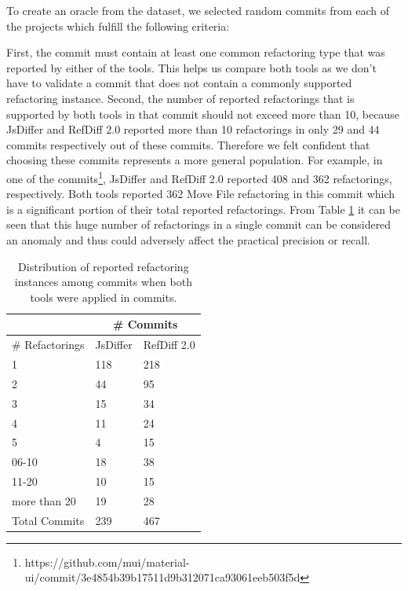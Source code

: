 \documentclass[letterpaper,12pt,onecolumn,final]{report}
\begin{document}
To create an oracle from the dataset, we selected \evCompareRandomCommitCount{} random commits from each of the projects which fulfill the following criteria:

First, the commit must contain at least one common refactoring type that was reported by either of the tools. This helps us compare both tools as we don't have to validate a commit that does not contain a commonly supported refactoring instance. Second, the number of reported refactorings that is supported by both tools in that commit should not exceed more than 10, because JsDiffer and RefDiff 2.0 reported more than 10 refactorings in only 29 and 44 commits respectively out of these \evCompareRandomCommitCount{} commits. Therefore we felt confident that choosing these commits represents a more general population. For example, in one of the commits\footnote{https://github.com/mui/material-ui/commit/3e4854b39b17511d9b312071ca93061eeb503f5d}, JsDiffer and RefDiff 2.0 reported 408 and 362 refactorings, respectively. Both tools reported 362 Move File refactoring in this commit which is a significant portion of their total reported refactorings. From Table \ref{table:refcountrange} it can be seen that this huge number of refactorings in a single commit can be considered an anomaly and thus could adversely affect the practical precision or recall.


\begin{table}[!ht]
    \centering
    \caption{Distribution of reported refactoring instances among commits when both tools were applied in \evTotalCommits{} commits.}
    \begin{tabular}{|l|l|l|}
    \hline
        & \multicolumn{2}{|c|}{\# Commits} \\ \hline
        \# Refactorings & JsDiffer & RefDiff 2.0 \\ \hline
        1 & 118 & 218 \\
        2 & 44 & 95 \\
        3 & 15 & 34 \\
        4 & 11 & 24 \\
        5 & 4 & 15 \\
        06-10 & 18 & 38 \\
        11-20 & 10 & 15 \\
        more than 20 & 19 & 28 \\ \hline
        Total Commits & 239 & 467 \\ \hline
    \end{tabular}
    \label{table:refcountrange}
\end{table}
\end{document}
